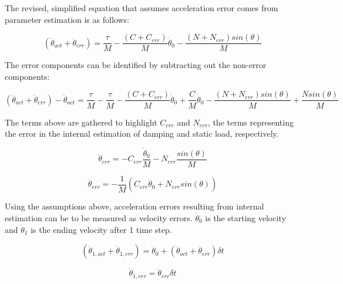 The revised, simplified equation that assumes acceleration error comes from parameter estimation is as follows:

\begin{equation}
\left(\ddot{\theta}_{act} + \ddot{\theta}_{err} \right) = \dfrac{\tau}{M} - \dfrac{ \left(C + C_{err} \right)}{M}\dot{\theta}_{0} - \dfrac{ \left(N + N_{err} \right)sin \left(\theta \right)}{M}
\end{equation}

The error components can be identified by subtracting out the non-error 
components:

\begin{equation}
\left(\ddot{\theta}_{act} + \ddot{\theta}_{err} \right) - \ddot{\theta}_{act} =
\dfrac{\tau}{M} - \dfrac{\tau}{M}
- \dfrac{ \left(C + C_{err} \right)}{M}\dot{\theta}_{0} + \dfrac{C}{M}\dot{\theta}_{0}
- \dfrac{ \left(N + N_{err} \right)sin \left(\theta \right)}{M}  + \dfrac{N sin \left(\theta \right)}{M}
\end{equation}

The terms above are gathered to highlight $C_{err}$ and $N_{err}$, the terms representing the error in the internal estimation of damping and static load, respectively.

\begin{equation}
\ddot{\theta}_{err} =
- C_{err} \dfrac{\dot{\theta}_{0}}{M}
- N_{err} \dfrac{sin \left(\theta \right)}{M}
\end{equation}

\begin{equation} \label{eq:accel_error}
\ddot{\theta}_{err} = - \dfrac{1}{M}
\left(C_{err} \dot{\theta}_{0} + N_{err} sin \left(\theta \right) \right)
\end{equation}


Using the assumptions above, acceleration errors resulting from internal estimation can be to be measured as velocity errors. $\dot{\theta}_{0}$ is the starting velocity and $\dot{\theta}_{1}$ is the ending velocity after 1 time step.

\begin{equation}
\left(\dot{\theta}_{1, act} + \dot{\theta}_{1, err} \right) = \dot{\theta}_{0} + \left(\ddot{\theta}_{act} + \ddot{\theta}_{err} \right) \delta t
\end{equation}

\begin{equation}
\dot{\theta}_{1, err} = \ddot{\theta}_{err} \delta t
\end{equation}

